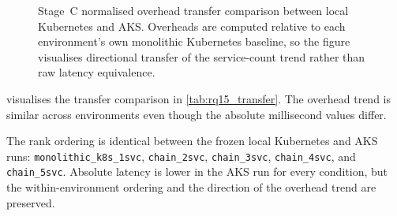 \begin{figure}[htbp]
\centering
\resizebox{0.92\textwidth}{!}{%

}
\caption[Stage~C normalised overhead transfer comparison]{Stage~C normalised overhead transfer comparison between local Kubernetes and AKS. Overheads are computed relative to each environment's own monolithic Kubernetes baseline, so the figure visualises directional transfer of the service-count trend rather than raw latency equivalence.}
\label{fig:rq15_transfer_overhead}
\end{figure}

 visualises the transfer comparison in
\cref{tab:rq15_transfer}. The overhead trend is similar across environments even though
the absolute millisecond values differ.

The rank ordering is identical between the frozen local Kubernetes and AKS runs:
\texttt{monolithic\_k8s\_1svc}, \texttt{chain\_2svc}, \texttt{chain\_3svc},
\texttt{chain\_4svc}, and \texttt{chain\_5svc}. Absolute latency is lower in the AKS
run for every condition, but the within-environment ordering and the direction of the
overhead trend are preserved.

\begin{table}[ht]
\centering
\caption[Stage~C AKS cross-round consistency]{Stage~C AKS cross-round consistency. Source: frozen Stage~C \texttt{merged\_results/round\_consistency.json}.}
\label{tab:rq15_rounds}
\end{table}

